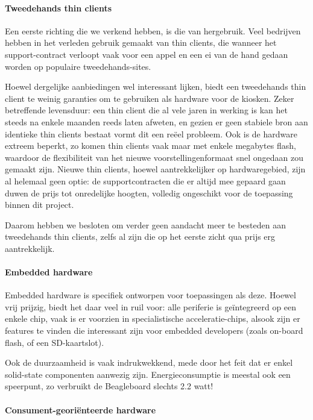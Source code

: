 \documentclass[verslag.tex]{subfiles}
\begin{document}
\paragraph{Tweedehands thin clients}

Een eerste richting die we verkend hebben, is die van hergebruik. Veel bedrijven hebben in het verleden gebruik gemaakt van thin clients, die wanneer het support-contract verloopt vaak voor een appel en een ei van de hand gedaan worden op populaire tweedehands-sites.

Hoewel dergelijke aanbiedingen wel interessant lijken, biedt een tweedehands thin client te weinig garanties om te gebruiken als hardware voor de kiosken. Zeker betreffende levensduur: een thin client die al vele jaren in werking is kan het steeds na enkele maanden reeds laten afweten, en gezien er geen stabiele bron aan identieke thin clients bestaat vormt dit een reëel probleem. Ook is de hardware extreem beperkt, zo komen thin clients vaak maar met enkele megabytes flash, waardoor de flexibiliteit van het nieuwe voorstellingenformaat snel ongedaan zou gemaakt zijn. Nieuwe thin clients, hoewel aantrekkelijker op hardwaregebied, zijn al helemaal geen optie: de supportcontracten die er altijd mee gepaard gaan duwen de prijs tot onredelijke hoogten, volledig ongeschikt voor de toepassing binnen dit project.

Daarom hebben we besloten om verder geen aandacht meer te besteden aan tweedehands thin clients, zelfs al zijn die op het eerste zicht qua prijs erg aantrekkelijk.

\paragraph{Embedded hardware}

Embedded hardware is specifiek ontworpen voor toepassingen als deze. Hoewel vrij prijzig, biedt het daar veel in ruil voor: alle periferie is geïntegreerd op een enkele chip, vaak is er voorzien in specialistische acceleratie-chips, alsook zijn er features te vinden die interessant zijn voor embedded developers (zoals on-board flash, of een SD-kaartslot).

Ook de duurzaamheid is vaak indrukwekkend, mede door het feit dat er enkel solid-state componenten aanwezig zijn. Energieconsumptie is meestal ook een speerpunt, zo verbruikt de Beagleboard slechts 2.2 watt!

\paragraph{Consument-georiënteerde hardware}
\end{document}
